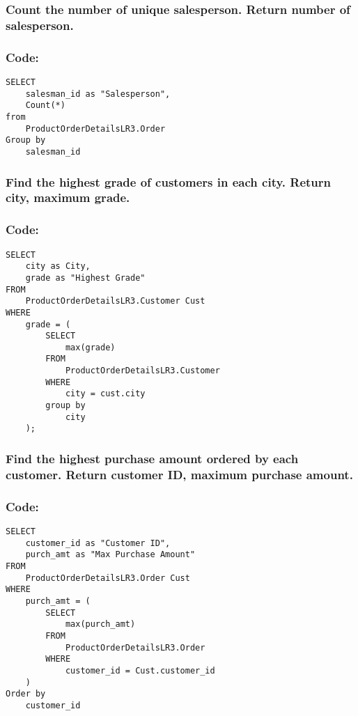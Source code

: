 \documentclass[12pt]{article}
\begin{document}
\subsubsection{Count the number of unique salesperson. Return number of salesperson.}
\subsubsection*{Code: }
\begin{verbatim}
SELECT
    salesman_id as "Salesperson",
    Count(*)
from
    ProductOrderDetailsLR3.Order
Group by
    salesman_id    
\end{verbatim}

\vspace{10mm}

\subsubsection{Find the highest grade of customers in each city. Return city, maximum grade.}
\subsubsection*{Code: }

\begin{verbatim}
SELECT
    city as City,
    grade as "Highest Grade"
FROM
    ProductOrderDetailsLR3.Customer Cust
WHERE
    grade = (
        SELECT
            max(grade)
        FROM
            ProductOrderDetailsLR3.Customer
        WHERE
            city = cust.city
        group by
            city
    );
\end{verbatim}

\vspace{10mm}

\subsubsection{Find the highest purchase amount ordered by each customer. Return customer ID, maximum purchase amount.}
\subsubsection*{Code:}

\begin{verbatim}
SELECT
    customer_id as "Customer ID",
    purch_amt as "Max Purchase Amount"
FROM
    ProductOrderDetailsLR3.Order Cust
WHERE
    purch_amt = (
        SELECT
            max(purch_amt)
        FROM
            ProductOrderDetailsLR3.Order
        WHERE
            customer_id = Cust.customer_id
    )
Order by
    customer_id
\end{verbatim}
\end{document}
